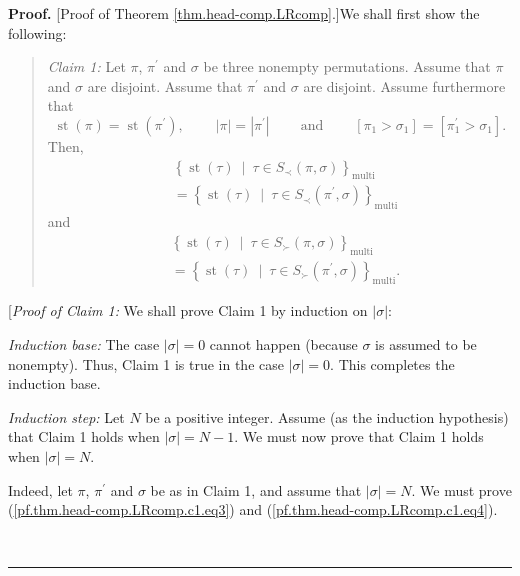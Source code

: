 \documentclass[numbers=enddot,12pt,final,onecolumn,notitlepage]{scrartcl}%
\theoremstyle{definition}
\newenvironment{statement}{\begin{quote}}{\end{quote}}
\newenvironment{proof}[1][Proof]{\noindent\textbf{#1.} }{\ \rule{0.5em}{0.5em}}
\begin{document}
\begin{proof}
[Proof of Theorem \ref{thm.head-comp.LRcomp}.]We shall first show the following:

\begin{statement}
\textit{Claim 1:} Let $\pi$, $\pi^{\prime}$ and $\sigma$ be three nonempty
permutations. Assume that $\pi$ and $\sigma$ are disjoint. Assume that
$\pi^{\prime}$ and $\sigma$ are disjoint. Assume furthermore that%
\[
\operatorname*{st}\left(  \pi\right)  =\operatorname*{st}\left(  \pi^{\prime
}\right)  ,\ \ \ \ \ \ \ \ \ \ \left\vert \pi\right\vert =\left\vert
\pi^{\prime}\right\vert \ \ \ \ \ \ \ \ \ \ \text{and}%
\ \ \ \ \ \ \ \ \ \ \left[  \pi_{1}>\sigma_{1}\right]  =\left[  \pi
_{1}^{\prime}>\sigma_{1}\right]  .
\]
Then,
\begin{align}
&  \left\{  \operatorname*{st}\left(  \tau\right)  \ \mid\ \tau\in S_{\prec
}\left(  \pi,\sigma\right)  \right\}  _{\operatorname*{multi}}\nonumber\\
&  =\left\{  \operatorname*{st}\left(  \tau\right)  \ \mid\ \tau\in S_{\prec
}\left(  \pi^{\prime},\sigma\right)  \right\}  _{\operatorname*{multi}}
\label{pf.thm.head-comp.LRcomp.c1.eq3}%
\end{align}
and%
\begin{align}
&  \left\{  \operatorname*{st}\left(  \tau\right)  \ \mid\ \tau\in S_{\succ
}\left(  \pi,\sigma\right)  \right\}  _{\operatorname*{multi}}\nonumber\\
&  =\left\{  \operatorname*{st}\left(  \tau\right)  \ \mid\ \tau\in S_{\succ
}\left(  \pi^{\prime},\sigma\right)  \right\}  _{\operatorname*{multi}}.
\label{pf.thm.head-comp.LRcomp.c1.eq4}%
\end{align}

\end{statement}

[\textit{Proof of Claim 1:} We shall prove Claim 1 by induction on $\left\vert
\sigma\right\vert $:

\textit{Induction base:} The case $\left\vert \sigma\right\vert =0$ cannot
happen (because $\sigma$ is assumed to be nonempty). Thus, Claim 1 is true in
the case $\left\vert \sigma\right\vert =0$. This completes the induction base.

\textit{Induction step:} Let $N$ be a positive integer. Assume (as the
induction hypothesis) that Claim 1 holds when $\left\vert \sigma\right\vert
=N-1$. We must now prove that Claim 1 holds when $\left\vert \sigma\right\vert
=N$.

Indeed, let $\pi$, $\pi^{\prime}$ and $\sigma$ be as in Claim 1, and assume
that $\left\vert \sigma\right\vert =N$. We must prove
(\ref{pf.thm.head-comp.LRcomp.c1.eq3}) and
(\ref{pf.thm.head-comp.LRcomp.c1.eq4}).


\end{proof}
\end{document}
